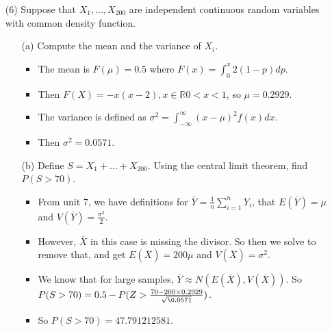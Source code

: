 \documentclass{article}
\begin{document}
\begin{enumerate}
\begin{itemize}
    \end{itemize}

\item [(6)] Suppose that $X_1,\ldots,X_{200}$ are independent continuous random variables with common density function.
    \begin{itemize}
    \item [(a)] Compute the mean and the variance of $X_i$.
        \begin{itemize}
        \item The mean is $F(\mu) = 0.5$ where $F(x) = \int_0^x 2(1 - p)dp$.
        \item Then $F(X) = -x(x - 2), x \in \mathbb{R} 0 < x < 1$, so $\mu = 0.2929$.
        \item The variance is defined as $\sigma^2 = \int_{-\infty}^{\infty} (x - \mu)^2 f(x) dx$.
        \item Then $\sigma^2 = 0.0571$.
        \end{itemize}
    \item [(b)] Define $S=X_1+\ldots+X_{200}$. Using the central limit theorem, find $P(S>70)$.
        \begin{itemize}
        \item From unit 7, we have definitions for $\overbar{Y} = \frac{1}{n} \sum_{i = 1}^n Y_i$, that $E(\overbar{Y}) = \mu$ and $V(\overbar{Y}) = \frac{\sigma^2}{2}$.
        \item However, $\overbar{X}$ in this case is missing the divisor. So then we solve to remove that, and get $E(\overbar{X}) = 200 \mu$ and $V(\overbar{X}) = \sigma^2$.
        \item We know that for large samples, $\overbar{Y} \approx N(E(\overbar{X}), V(\overbar{X}))$. So $P(S > 70) = 0.5 - P(Z > \frac{70 - 200 \times 0.2929}{\sqrt{\0.0571}})$.
        \item So $P(S > 70) = 47.791212581$.
        \end{itemize}
    \end{itemize}
\end{enumerate}
\end{document}
